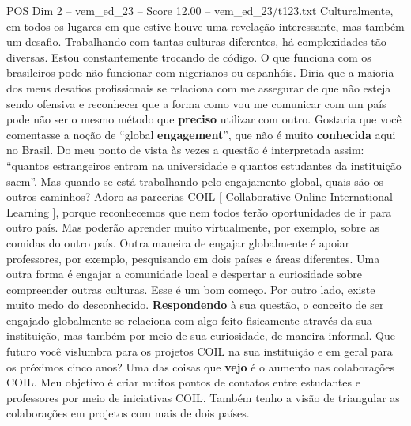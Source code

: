 \begin{textsample}{POS Dim 2 – vem\_ed\_23 – Score 12.00 – vem\_ed\_23/t123.txt}
Culturalmente, em todos os lugares em que estive houve uma revelação interessante, mas também um desafio.
Trabalhando com tantas culturas diferentes, há complexidades tão diversas.
Estou constantemente trocando de código.
O que funciona com os brasileiros pode não funcionar com nigerianos ou espanhóis.
Diria que a maioria dos meus desafios profissionais se relaciona com me assegurar de que não esteja sendo ofensiva e reconhecer que a forma como vou me comunicar com um país pode não ser o mesmo método que \textbf{preciso} utilizar com outro.
Gostaria que você comentasse a noção de “global \textbf{engagement}”, que não é muito \textbf{conhecida} aqui no Brasil.
Do meu ponto de vista às vezes a questão é interpretada assim: “quantos estrangeiros entram na universidade e quantos estudantes da instituição saem”.
Mas quando se está trabalhando pelo engajamento global, quais são os outros caminhos?
Adoro as parcerias COIL [ Collaborative Online International Learning ], porque reconhecemos que nem todos terão oportunidades de ir para outro país.
Mas poderão aprender muito virtualmente, por exemplo, sobre as comidas do outro país.
Outra maneira de engajar globalmente é apoiar professores, por exemplo, pesquisando em dois países e áreas diferentes.
Uma outra forma é engajar a comunidade local e despertar a curiosidade sobre compreender outras culturas.
Esse é um bom começo.
Por outro lado, existe muito medo do desconhecido. \textbf{Respondendo} à sua questão, o conceito de ser engajado globalmente se relaciona com algo feito fisicamente através da sua instituição, mas também por meio de sua curiosidade, de maneira informal.
Que futuro você vislumbra para os projetos COIL na sua instituição e em geral para os próximos cinco anos?
Uma das coisas que \textbf{vejo} é o aumento nas colaborações COIL.
Meu objetivo é criar muitos pontos de contatos entre estudantes e professores por meio de iniciativas COIL.
Também tenho a visão de triangular as colaborações em projetos com mais de dois países.

\end{textsample}
